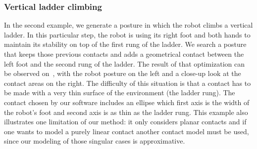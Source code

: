 \subsubsection{Vertical ladder climbing}
\label{subsubsec:ladder}


In the second example, we generate a posture in which the robot climbs a vertical ladder.
In this particular step, the robot is using its right foot and both hands to maintain its stability on top of the first rung of the ladder.
We search a posture that keeps those previous contacts and adds a geometrical contact between the left foot and the second rung of the ladder.
The result of that optimization can be observed on~, with the robot posture on the left and a close-up look at the contact areas on the right.
The difficulty of this situation is that a contact has to be made with a very thin surface of the environment (the ladder rung).
The contact chosen by our software includes an ellipse which first axis is the width of the robot's foot and second axis is as thin as the ladder rung.
This example also illustrates one limitation of our method: it only considers planar contacts and if one wants to model a purely linear contact another contact model must be used, since our modeling of those singular cases is approximative.


